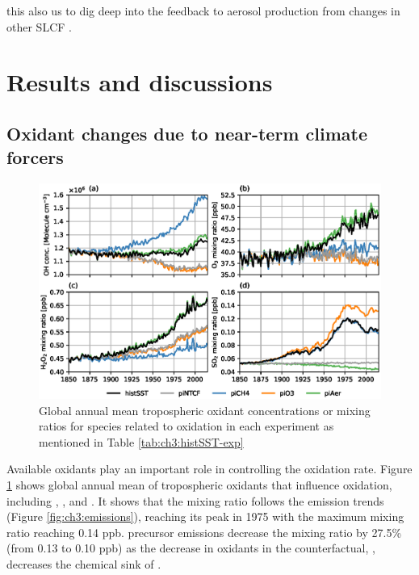 this also us to dig deep into the feedback to aerosol production from changes in other SLCF .


\section{Results and discussions}
\label{sec:ch3:results}



\subsection{Oxidant changes due to near-term climate forcers}

\begin{figure}
    \centering
    \includegraphics[width=\linewidth]{Chapter3/Figs/f02_oxidant-changes.eps}
    \caption[Global annual mean tropospheric oxidant concentrations or mixing ratios]{Global annual mean tropospheric oxidant concentrations or mixing ratios for species related to  oxidation in each experiment as mentioned in Table \ref{tab:ch3:histSST-exp}}
    \label{fig:ch3:oxidants}
\end{figure}

Available oxidants play an important role in controlling the oxidation rate. Figure \ref{fig:ch3:oxidants} shows global annual mean of tropospheric oxidants that influence  oxidation, including , ,  and . It shows that the  mixing ratio follows the  emission trends (Figure \ref{fig:ch3:emissions}), reaching its peak in 1975 with the maximum mixing ratio reaching 0.14 ppb.  precursor emissions decrease the  mixing ratio by 27.5\% (from 0.13 to 0.10 ppb) as the decrease in oxidants in the counterfactual, \sstpio{}, decreases the chemical sink of . 


